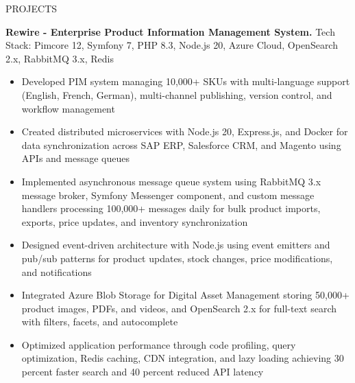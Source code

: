 \documentclass{resume} %
\begin{document}
\begin{rSection}{PROJECTS}
\item \textbf{Rewire - Enterprise Product Information Management System.} {Tech Stack: Pimcore 12, Symfony 7, PHP 8.3, Node.js 20, Azure Cloud, OpenSearch 2.x, RabbitMQ 3.x, Redis}
\begin{itemize}
    \itemsep -3pt {}
    \item Developed PIM system managing 10,000+ SKUs with multi-language support (English, French, German), multi-channel publishing, version control, and workflow management
    \item Created distributed microservices with Node.js 20, Express.js, and Docker for data synchronization across SAP ERP, Salesforce CRM, and Magento using APIs and message queues
    \item Implemented asynchronous message queue system using RabbitMQ 3.x message broker, Symfony Messenger component, and custom message handlers processing 100,000+ messages daily for bulk product imports, exports, price updates, and inventory synchronization
    \item Designed event-driven architecture with Node.js using event emitters and pub/sub patterns for product updates, stock changes, price modifications, and notifications
    \item Integrated Azure Blob Storage for Digital Asset Management storing 50,000+ product images, PDFs, and videos, and OpenSearch 2.x for full-text search with filters, facets, and autocomplete
    \item Optimized application performance through code profiling, query optimization, Redis caching, CDN integration, and lazy loading achieving 30 percent faster search and 40 percent reduced API latency
\end{itemize}

\end{rSection}

\end{document}
